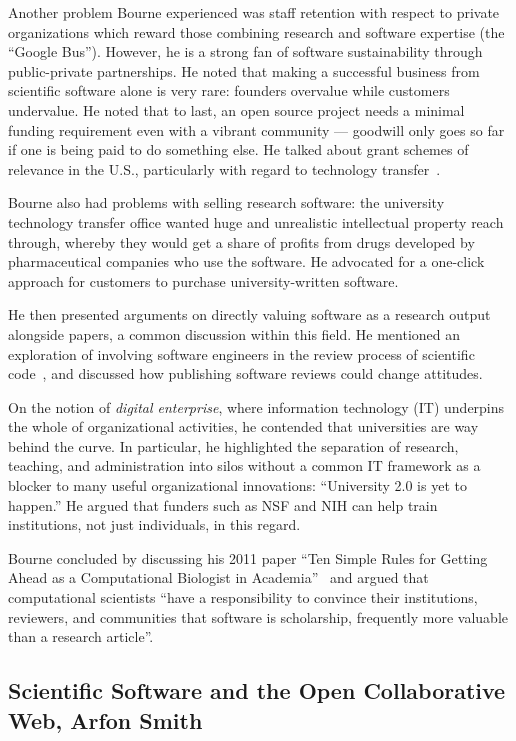 \documentclass[11pt, oneside]{amsart}
\begin{document}
Another problem Bourne experienced was staff retention with respect to
private organizations which reward those combining research and
software expertise (the ``Google Bus''). However, he is a strong fan
of software sustainability through public-private partnerships. He
noted that making a successful business from scientific software alone
is very rare: founders overvalue while customers undervalue. He noted
that to last, an open source project needs a minimal funding
requirement even with a vibrant community --- goodwill only goes so
far if one is being paid to do something else.  He talked about grant
schemes of relevance in the U.S., particularly with regard to
technology transfer~\cite{sbir-web, fased-web}.

Bourne also had problems with selling research software: the university technology
transfer office wanted huge and unrealistic intellectual property
reach through, whereby they would get a share of profits from drugs
developed by pharmaceutical companies who use the software. 
He advocated for  a one-click approach for customers to
purchase university-written software.

He then presented arguments on directly valuing software as
a research output alongside papers, a common discussion within this field.
He mentioned an  exploration of involving software
engineers in the review process of scientific code~\cite{peer-review-code}, and discussed 
how publishing software reviews could change attitudes.

On the notion of \emph{digital enterprise}, where information
technology (IT) underpins the whole of organizational activities, he
contended that universities are way behind the curve. In
particular, he highlighted the separation of research, teaching, and
administration into silos without a common IT framework as a blocker
to many useful organizational innovations: ``University 2.0 is yet to
happen.''  He argued that
funders such as NSF and NIH can help train institutions, not just individuals, in this regard. 

Bourne concluded by discussing his 2011 paper ``Ten Simple Rules for Getting Ahead as a Computational Biologist in Academia''~\cite{bourne_ten} and
argued that computational scientists ``have a responsibility to
convince their institutions, reviewers, and communities that software is
scholarship, frequently
more valuable than a research article''.

\subsection{Scientific Software and the Open Collaborative Web, Arfon Smith} \label{sec:keynote2}
\end{document}
